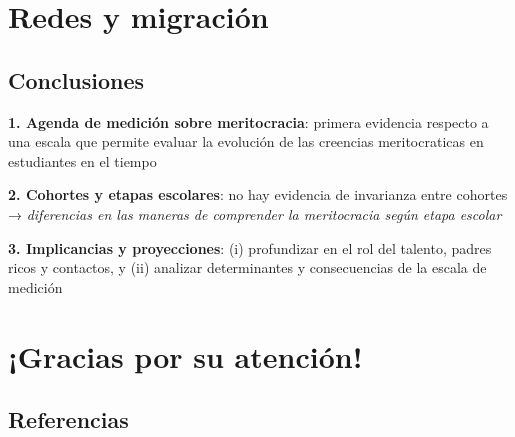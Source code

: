 \documentclass[
  spanish,
  letterpaper,
  DIV=11,
  numbers=noendperiod,
  oneside]{scrartcl}
\begin{document}
\section{Redes y migración}\label{redes-y-migraciuxf3n}

\subsection{Conclusiones}\label{conclusiones}

\textbf{1. Agenda de medición sobre meritocracia}: primera evidencia
respecto a una escala que permite evaluar la evolución de las creencias
meritocraticas en estudiantes en el tiempo

\textbf{2. Cohortes y etapas escolares}: no hay evidencia de invarianza
entre cohortes → \emph{diferencias en las maneras de comprender la
meritocracia según etapa escolar}

\textbf{3. Implicancias y proyecciones}: (i) profundizar en el rol del
talento, padres ricos y contactos, y (ii) analizar determinantes y
consecuencias de la escala de medición

\section{¡Gracias por su atención!}\label{gracias-por-su-atenciuxf3n}

\subsection{Referencias}\label{referencias}

\label{refs}
\end{document}
